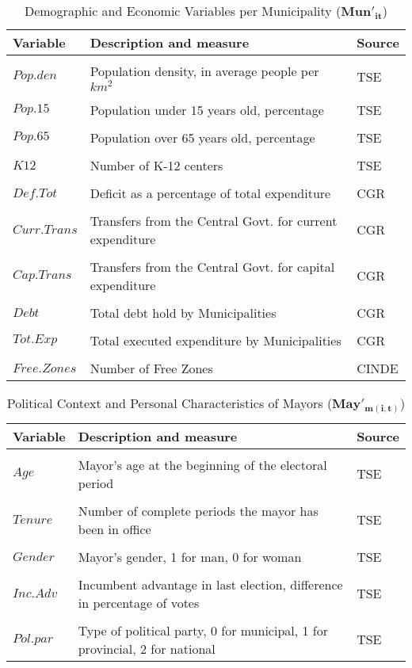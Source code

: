 \begin{table}[ht]
\caption{Demographic and Economic Variables per Municipality ($\mathbf{Mun'_{it}}$)}
\centering
\begin{tabular}{l l l}
\hline\hline
Variable & Description and measure & Source \\ [0.5ex] 
\hline
\\
$Pop.den$ & Population density, in average people per $km^2$ & TSE\\ 
\\
$Pop.15$ & Population under 15 years old, percentage & TSE \\
\\
$Pop.65$ & Population over 65 years old, percentage & TSE \\
\\
$K12$ & Number of K-12 centers & TSE \\
\\
$Def.Tot$ & Deficit as a percentage of total expenditure & CGR \\
\\
$Curr.Trans$ & Transfers from the Central Govt. for current expenditure & CGR \\
\\
$Cap.Trans$ & Transfers from the Central Govt. for capital expenditure & CGR \\
\\
$Debt$ & Total debt hold by Municipalities & CGR \\
\\
$Tot.Exp$ & Total executed expenditure by Municipalities & CGR 
\\
\\
$Free.Zones$ & Number of Free Zones & CINDE \\
[1ex]
\hline
\end{tabular}
\label{table:demoecon}
\end{table}

\begin{table}[ht]
\caption{Political Context and Personal Characteristics of Mayors ($\mathbf{May'_{m(i,t)}}$)}
\centering
\begin{tabular}{l l l}
\hline\hline
Variable & Description and measure & Source \\ [0.5ex] 
\hline
\\
$Age$ & Mayor's age at the beginning of the electoral period  & TSE\\
\\
$Tenure$ & Number of complete periods the mayor has been in office  & TSE\\
\\
$Gender$ & Mayor's gender, 1 for man, 0 for woman  & TSE\\
\\
$Inc.Adv$ & Incumbent advantage in last election, difference in percentage of votes & TSE\\
\\
$Pol.par$ & Type of political party, 0 for municipal, 1 for provincial, 2 for national & TSE\\
[1ex]
\hline
\end{tabular}
\label{table:polmayor}
\end{table}

